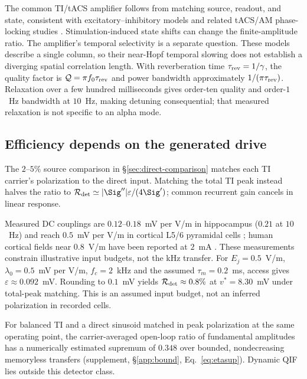 The common TI/tACS amplifier follows from matching source, readout, and state, consistent with excitatory--inhibitory models \cite{ledoux2011,clusella2023} and related tACS/AM phase-locking studies \cite{ali2013,negahbani2018,krause2023}. Stimulation-induced state shifts can change the finite-amplitude ratio. The amplifier's temporal selectivity is a separate question. These models describe a single column, so their near-Hopf temporal slowing does not establish a diverging spatial correlation length. With reverberation time $\tau_{\rm rev}=1/\gamma$, the quality factor is $\mathcal Q=\pi f_0\tau_{\rm rev}$ and power bandwidth approximately $1/(\pi\tau_{\rm rev})$. Relaxation over a few hundred milliseconds \cite{wilting2018} gives order-ten quality and order-$1$~Hz bandwidth at $10$~Hz, making detuning consequential; that measured relaxation is not specific to an alpha mode.

\subsection{Efficiency depends on the generated drive}
The $2$--$5\%$ source comparison in \S\ref{sec:direct-comparison} matches each
TI carrier's polarization to the direct input. Matching the total TI peak instead halves the
ratio to $\mathcal R_{\rm det}\simeq|\Sig''|\varepsilon/(4\Sig')$; common
recurrent gain cancels in linear response.

Measured DC couplings are $0.12$--$0.18$~mV per V/m in hippocampus ($0.21$ at $10$~Hz)
\cite{bikson2004,deans2007} and reach $0.5$~mV per V/m in cortical L5/6 pyramidal
cells \cite{radman2009}; human cortical fields near $0.8$~V/m have been reported
at $2$~mA \cite{huang2017,huang2017corr}. These measurements constrain illustrative
input budgets, not the kHz transfer. For $E_j=0.5$~V/m,
$\lambda_0=0.5$~mV per V/m, $f_c=2$~kHz and the assumed $\tau_m=0.2$~ms, access
gives $\varepsilon\approx0.092$~mV. Rounding to $0.1$~mV yields
$\mathcal R_{\rm det}\approx0.8\%$ at $v^*=8.30$~mV under total-peak matching.
This is an assumed input budget, not an inferred polarization in recorded cells.

For balanced TI and a direct sinusoid matched in peak polarization at the same
operating point, the carrier-averaged open-loop ratio of fundamental amplitudes
has a numerically estimated supremum of $0.348$ over bounded,
nondecreasing memoryless transfers (supplement, \S\ref{app:bound},
Eq.~\eqref{eq:etasup}). Dynamic QIF lies outside this detector class.

